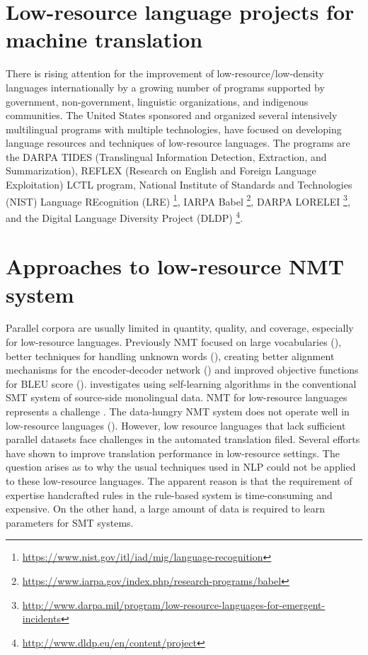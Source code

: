 \documentclass[manuscript,screen]{acmart}
\begin{document}
\section{Low-resource language projects for machine translation}
\label{project}
There is rising attention for the improvement of low-resource/low-density languages internationally by a growing number of programs supported by government, non-government, linguistic organizations, and indigenous communities. The United States sponsored and organized several intensively multilingual programs with multiple technologies, have focused on developing language resources and techniques of low-resource languages. The programs are the DARPA TIDES (Translingual Information Detection, Extraction, and Summarization), REFLEX (Research on English and Foreign Language Exploitation) LCTL program, National Institute of Standards and Technologies (NIST) Language REcognition (LRE) \footnote {\url{https://www.nist.gov/itl/iad/mig/language-recognition}}, IARPA Babel \footnote {\url{ https://www.iarpa.gov/index.php/research-programs/babel}}, DARPA LORELEI \footnote {\url{  http://www.darpa.mil/program/low-resource-languages-for-emergent-incidents}}, and the Digital Language Diversity Project (DLDP) \footnote{ \url{http://www.dldp.eu/en/content/project}}. 

\section{Approaches to low-resource NMT system}
\label{approach}

Parallel corpora are usually limited in quantity, quality, and coverage, especially for low-resource languages. Previously NMT focused on large vocabularies (\citet{jean2015using,mi2016vocabulary}), better techniques for handling unknown words (\citet{luong-etal-2015-addressing,sennrich2016neural,li2016towards}), creating better alignment mechanisms for the encoder-decoder network (\citet{cheng2016neural,luong2015effective, cohn-etal-2016-incorporating,FENG18.3,tu2016modeling,mi2016coverage,mi2016supervised}) and improved objective functions for BLEU score (\citet{shen2016minimum}). \citet{ueffing2006using,wu2008domain} investigates using self-learning algorithms in the conventional SMT system of source-side monolingual data.
NMT for low-resource languages represents a challenge \citet{koehn2017six}. The data-hungry NMT system does not operate well in low-resource languages (\citet{zoph2016transfer,ostling2017neural}). 
However, low resource languages that lack sufficient parallel datasets face challenges in the automated translation filed. Several efforts have shown to improve translation performance in low-resource settings. The question arises as to why the usual techniques used in NLP could not be applied to these low-resource languages. The apparent reason is that the requirement of expertise handcrafted rules in the rule-based system is time-consuming and expensive. On the other hand, a large amount of data is required to learn parameters for SMT systems.
\end{document}
